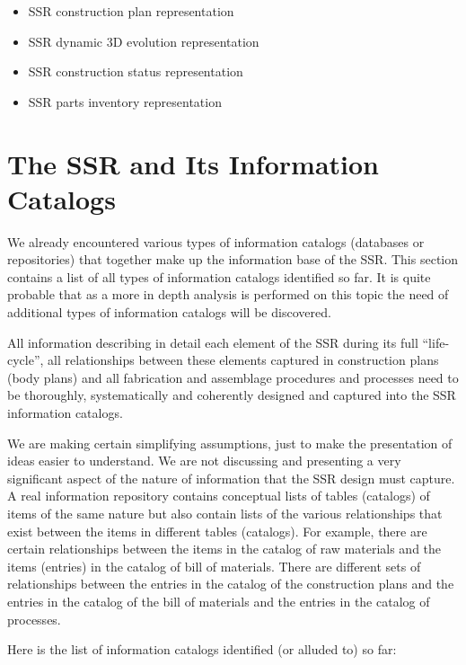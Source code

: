 \begin{itemize}
\item SSR construction plan representation
\item SSR dynamic 3D evolution representation
\item SSR construction status representation
\item SSR parts inventory representation
\end{itemize}

\section{The SSR and Its Information Catalogs}

We already encountered various types of information catalogs (databases
or repositories) that together make up the information base of the SSR.
This section contains a list of all types of information catalogs
identified so far. It is quite probable that as a more in depth
analysis is performed on this topic the need of additional types of
information catalogs will be discovered.

All information describing in detail each element of the SSR during its
full “life-cycle”, all relationships between these elements captured in
construction plans (body plans) and all fabrication and assemblage
procedures and processes need to be thoroughly, systematically and
coherently designed and captured into the SSR information catalogs.

We are making certain simplifying assumptions, just to make the
presentation of ideas easier to understand. We are not discussing and
presenting a very significant aspect of the nature of information that
the SSR design must capture. A real information repository contains
conceptual lists of tables (catalogs) of items of the same nature but
also contain lists of the various relationships that exist between the
items in different tables (catalogs).  For example, there are certain
relationships between the items in the catalog of raw materials and the
items (entries) in the catalog of bill of materials. There are
different sets of relationships between the entries in the catalog of
the construction plans and the entries in the catalog of the bill of
materials and the entries in the catalog of processes.

Here is the list of information catalogs identified (or alluded to) so
far:

